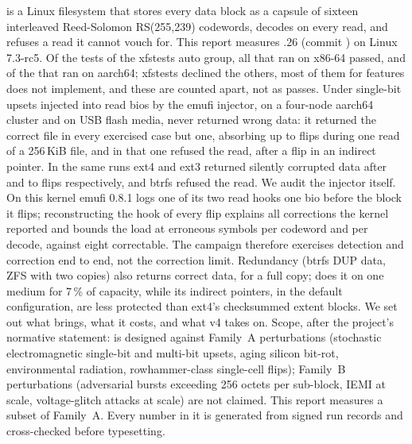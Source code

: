 \bfs is a Linux filesystem that stores every data block as a capsule of
sixteen interleaved Reed-Solomon RS(255,239) codewords, decodes on every
read, and refuses a read it cannot vouch for. This report measures
.26 (commit \commitBeamfs) on Linux 7.3-rc5. Of the
\xfsTotal{} tests of the xfstests auto group, all \xfsXRan{} that ran
on x86-64 passed, and \xfsAPass{} of the \xfsARan{} that ran on
aarch64; xfstests declined the others, most of them for features \bfs
does not implement, and these are counted apart, not as passes. Under
single-bit upsets injected into read bios by the emufi injector, on a
four-node aarch64 cluster and on USB flash media, \bfs never returned
wrong data: it returned the correct file in every exercised case but
one, absorbing up to \mfBeamfsMaxFlips{} flips during one read of a
256\,KiB file, and in that one refused the read, after a flip in an
indirect pointer. In the same runs ext4 and ext3 returned silently corrupted
data after \mfExtFourFlipsMax{} and \mfExtThreeFlipsMin{} to
\mfExtThreeFlipsMax{} flips respectively, and btrfs refused the read.
We audit the injector itself. On this kernel emufi 0.8.1 logs one of its
two read hooks one bio before the block it flips; reconstructing the hook
of every flip explains all  corrections the kernel reported
and bounds the load at  erroneous symbols per codeword
and per decode, against eight correctable. The campaign therefore
exercises detection and correction end to end, not the correction limit.
Redundancy (btrfs DUP data, ZFS with two copies) also returns
correct data, for a full copy; \bfs does it on one medium for 7\,\% of
capacity, while its indirect pointers, in the default configuration, are
less protected than ext4's checksummed extent blocks. We set out what
\bfs brings, what it costs, and what v4 takes on.
Scope, after the project's normative statement: \bfs is designed against
Family~A perturbations (stochastic electromagnetic single-bit and
multi-bit upsets, aging silicon bit-rot, environmental radiation,
rowhammer-class single-cell flips); Family~B perturbations (adversarial
bursts exceeding 256 octets per sub-block, IEMI at scale, voltage-glitch
attacks at scale) are not claimed. This report measures a subset of
Family~A. Every number in it is generated from signed run records and
cross-checked before typesetting.
